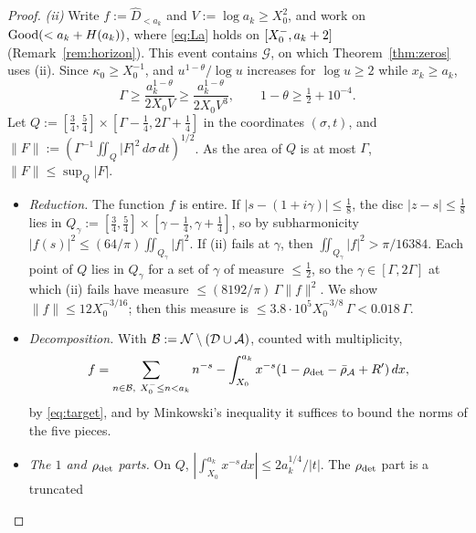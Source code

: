 \begin{proof}
\emph{(ii)} Write $f:=\widehat D_{<a_k}$ and $V:=\log a_k\ge X_0^2$, and work on $\mathrm{Good}(<a_k+H(a_k))$, where \eqref{eq:La} holds on
$[X_0^{-},a_k+2]$ (Remark~\ref{rem:horizon}). This event contains $\mathcal G$, on which Theorem~\ref{thm:zeros} uses (ii).
Since $\kappa_0\ge X_0^{-1}$, and $u^{1-\theta}/\log u$ increases for $\log u\ge2$ while $x_k\ge a_k$,
\begin{equation}\label{eq:Gammalow}
  \Gamma\ge\frac{a_k^{1-\theta}}{2X_0V}\ge\frac{a_k^{1-\theta}}{2X_0V^3},\qquad 1-\theta\ge\tfrac12+10^{-4}.
\end{equation}
Let $Q:=[\frac34,\frac54]\times[\Gamma-\frac14,2\Gamma+\frac14]$ in the coordinates $(\sigma,t)$, and
$\|F\|:=(\Gamma^{-1}\iint_Q|F|^2\,d\sigma\,dt)^{1/2}$. As the area of $Q$ is at most $\Gamma$, $\|F\|\le\sup_Q|F|$.
\begin{itemize}
\item \emph{Reduction.} The function $f$ is entire. If $|s-(1+i\gamma)|\le\frac18$, the disc $|z-s|\le\frac18$ lies in
$Q_\gamma:=[\frac34,\frac54]\times[\gamma-\frac14,\gamma+\frac14]$, so by subharmonicity $|f(s)|^2\le(64/\pi)\iint_{Q_\gamma}|f|^2$. If (ii)
fails at $\gamma$, then $\iint_{Q_\gamma}|f|^2>\pi/16384$. Each point of $Q$ lies in $Q_\gamma$ for a set of $\gamma$ of measure
$\le\frac12$, so the $\gamma\in[\Gamma,2\Gamma]$ at which (ii) fails have measure $\le(8192/\pi)\,\Gamma\|f\|^2$. We show
$\|f\|\le12X_0^{-3/16}$; then this measure is $\le3.8\cdot10^5X_0^{-3/8}\,\Gamma<0.018\,\Gamma$.
\item \emph{Decomposition.} With $\mathcal B:=\mathcal{N}\setminus(\mathcal D\cup\mathcal{A})$, counted with multiplicity,
\[
  f=\sum_{n\in\mathcal B,\ X_0^{-}\le n<a_k}n^{-s}-\int_{X_0}^{a_k}x^{-s}(1-\rho_{\mathrm{det}}-\bar\rho_{\mathcal{A}}+R')\,dx,
\]
by \eqref{eq:target}, and by Minkowski's inequality it suffices to bound the norms of the five pieces.
\item \emph{The $1$ and $\rho_{\mathrm{det}}$ parts.} On $Q$, $|\int_{X_0}^{a_k}x^{-s}dx|\le2a_k^{1/4}/|t|$. The $\rho_{\mathrm{det}}$ part is a truncated

\end{itemize}
\end{proof}
